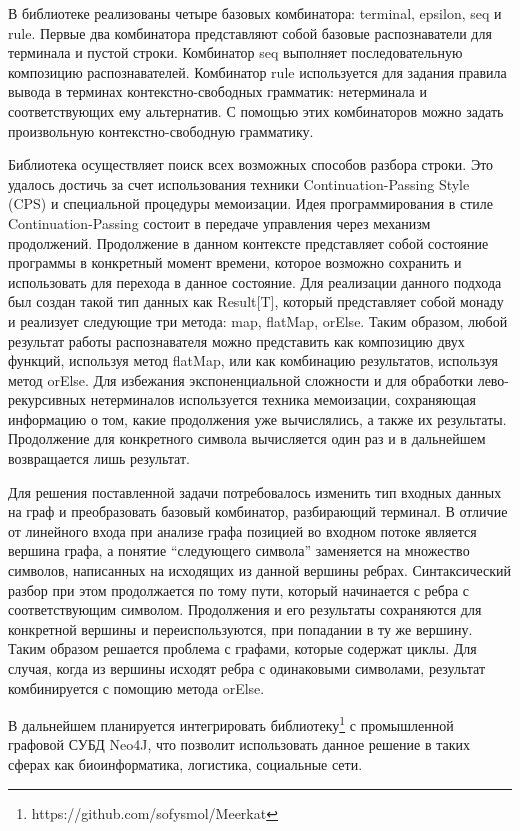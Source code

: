 \documentclass [a4paper] {article}
\begin{document}
В библиотеке реализованы четыре базовых комбинатора: terminal, epsilon, seq и rule. Первые два комбинатора представляют собой базовые распознаватели для терминала и пустой строки. Комбинатор seq выполняет последовательную композицию распознавателей. Комбинатор rule используется для задания правила вывода в терминах контекстно-свободных грамматик: нетерминала и соответствующих ему альтернатив. С помощью этих комбинаторов можно задать произвольную контекстно-свободную грамматику. 


Библиотека осуществляет поиск всех возможных способов разбора строки. Это удалось достичь за счет использования техники Continuation-Passing Style (CPS) и специальной процедуры мемоизации. Идея программирования в стиле Continuation-Passing состоит в передаче управления через механизм продолжений. Продолжение в данном контексте представляет собой состояние программы в конкретный момент времени, которое возможно сохранить и использовать для перехода в данное состояние. Для реализации данного подхода был создан такой тип данных как Result[T],  который представляет собой монаду и реализует следующие три метода: map, flatMap, orElse. Таким образом, любой результат работы распознавателя можно представить как композицию двух функций, используя метод flatMap, или как комбинацию результатов, используя метод orElse. Для избежания экспоненциальной сложности и для обработки лево-рекурсивных нетерминалов используется техника мемоизации, сохраняющая информацию о том, какие продолжения уже вычислялись, а также их результаты. Продолжение для конкретного символа вычисляется один раз и в дальнейшем возвращается лишь результат. 


Для решения поставленной задачи потребовалось изменить тип входных данных на граф и преобразовать базовый комбинатор, разбирающий терминал. В отличие от линейного входа при анализе графа позицией во входном потоке является вершина графа, а понятие ``следующего символа'' заменяется на множество символов, написанных на исходящих из данной вершины ребрах. Синтаксический разбор при этом продолжается по тому пути, который начинается с ребра с соответствующим символом. Продолжения и его результаты сохраняются для конкретной вершины и переиспользуются, при попадании в ту же вершину. Таким образом решается проблема с графами, которые содержат циклы.  Для случая, когда из вершины исходят ребра с одинаковыми символами, результат комбинируется с помощию метода orElse. 


В дальнейшем планируется интегрировать библиотеку\footnote{https://github.com/sofysmol/Meerkat} с промышленной графовой СУБД Neo4J, что позволит использовать данное решение в таких сферах как биоинформатика,  логистика, социальные сети.

\printbibliography

\end{document}
